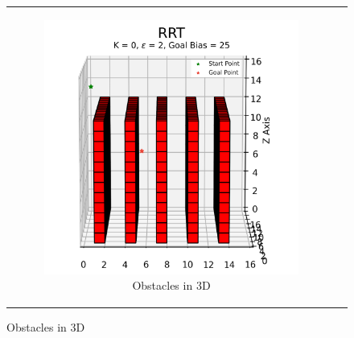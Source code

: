 \begin{figure}[H]
\begin{centering}
\begin{tabular}{cc}
    \begin{subfigure}{0.5\linewidth}
    \includegraphics[width=\linewidth]{chapters/chapter2/img/visualizing/obstacles3d.png}
    \caption{Obstacles in 3D}
    \end{subfigure} \\

\end{tabular}
\label{fig:rrt_obstacles}
\end{centering}
\end{figure}